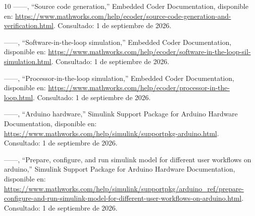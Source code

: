 \documentclass[conference,a4paper,10pt]{IEEEtran}
\begin{document}
\begin{thebibliography}{10}
------, ``Source code generation,'' Embedded Coder Documentation, disponible
  en:
  \url{https://www.mathworks.com/help/ecoder/source-code-generation-and-verification.html}.
  Consultado: 1 de septiembre de 2026.

------, ``Software-in-the-loop simulation,'' Embedded Coder Documentation,
  disponible en:
  \url{https://www.mathworks.com/help/ecoder/software-in-the-loop-sil-simulation.html}.
  Consultado: 1 de septiembre de 2026.

------, ``Processor-in-the-loop simulation,'' Embedded Coder Documentation,
  disponible en:
  \url{https://www.mathworks.com/help/ecoder/processor-in-the-loop.html}.
  Consultado: 1 de septiembre de 2026.

------, ``Arduino hardware,'' Simulink Support Package for Arduino Hardware
  Documentation, disponible en:
  \url{https://www.mathworks.com/help/simulink/supportpkg-arduino.html}.
  Consultado: 1 de septiembre de 2026.

------, ``Prepare, configure, and run simulink model for different user
  workflows on arduino,'' Simulink Support Package for Arduino Hardware
  Documentation, disponible en:
  \url{https://www.mathworks.com/help/simulink/supportpkg/arduino_ref/prepare-configure-and-run-simulink-model-for-different-user-workflows-on-arduino.html}.
  Consultado: 1 de septiembre de 2026.

\end{thebibliography}
\end{document}
